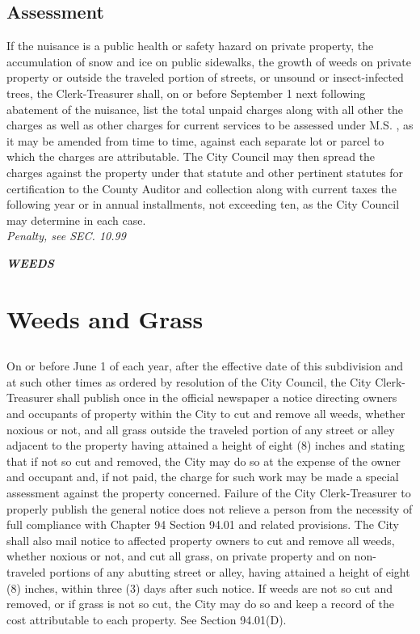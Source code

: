 \subsection{Assessment}
If the nuisance is a public health or safety hazard on private property, the accumulation of snow and ice on public sidewalks, the growth of weeds on private property or outside the traveled portion of streets, or unsound or insect-infected trees, the Clerk-Treasurer shall, on or before September 1 next following abatement of the nuisance, list the total unpaid charges along with all other the charges as well as other charges for current services to be assessed under M.S. , as it may be amended from time to time, against each separate lot or parcel to which the charges are attributable.  The City Council may then spread the charges against the property under that statute and other pertinent statutes for certification to the County Auditor and collection along with current taxes the following year or in annual installments, not exceeding ten, as the City Council may determine in each case.\\
\emph{Penalty, see SEC. 10.99}

\begin{center}
\emph{\textbf{\LARGE{WEEDS}}}
\end{center}
\setcounter{section}{34}
\section{Weeds and Grass}
\subsection{}
On or before June 1 of each year, after the effective date of this subdivision and at such other times as ordered by resolution of the City Council, the City Clerk-Treasurer shall publish once in the official newspaper a notice directing owners and occupants of property within the City to cut and remove all weeds, whether noxious or not, and all grass outside the traveled portion of any street or alley adjacent to the property having attained a height of eight (8) inches and stating that if not so cut and removed, the City may do so at the expense of the owner and occupant and, if not paid, the charge for such work may be made a special assessment against the property concerned. Failure of the City Clerk-Treasurer to properly publish the general notice does not relieve a person from the necessity of full compliance with Chapter 94 Section 94.01 and related provisions. The City shall also mail notice to affected property owners to cut and remove all weeds, whether noxious or not, and cut all grass, on private property and on non-traveled portions of any abutting street or alley, having attained a height of eight (8) inches, within three (3) days after such notice.  If weeds are not so cut and removed, or if grass is not so cut, the City may do so and keep a record of the cost attributable to each property. See Section 94.01(D).
